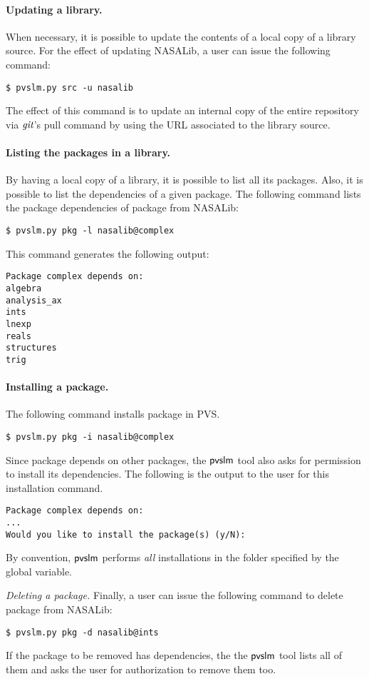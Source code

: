 \paragraph{Updating a library.} When necessary, it is possible to update
the contents of a local copy of a library source. For the effect of updating NASALib, a user can issue the following command:
%
\begin{verbatim}
$ pvslm.py src -u nasalib
\end{verbatim}
%
The effect of this command is to update an internal copy of the entire
repository via $\textit{git}$'s pull command by using the URL associated to
the library source.

\paragraph{Listing the packages in a library.} By having a local
copy of a library, it is possible to list all its packages. Also, it
is possible to list the dependencies of a given package. The following
command lists the package dependencies of package  from
NASALib:
%
\begin{verbatim}
$ pvslm.py pkg -l nasalib@complex
\end{verbatim}
%
This command generates the following output:
%
\begin{verbatim}
Package complex depends on:
algebra
analysis_ax
ints
lnexp
reals
structures
trig
\end{verbatim}

\paragraph{Installing a package.} The following command installs package
 in PVS.
%
\begin{verbatim}
$ pvslm.py pkg -i nasalib@complex
\end{verbatim}
%
Since package  depends on other packages, the $\textsf{pvslm}$
tool also asks for permission to install its dependencies. The
following is the output to the user for this installation command.
%
\begin{verbatim}
Package complex depends on:
...
Would you like to install the package(s) (y/N): 
\end{verbatim}
%
By convention, $\textsf{pvslm}$ performs {\em all} installations in the folder
specified by the  global variable.

{\em Deleting a package.} Finally, a user can issue the following
command to delete package  from NASALib:
%
\begin{verbatim}
$ pvslm.py pkg -d nasalib@ints
\end{verbatim}
%
If the package to be removed has dependencies, the the $\textsf{pvslm}$ tool
lists all of them and asks the user for authorization to remove them
too.
